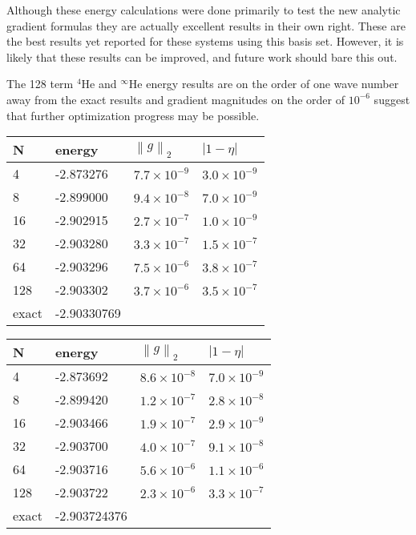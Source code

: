 \documentclass[12pt,thmsa,suthesis,verbatim]{report}
\begin{document}
Although these energy calculations were done primarily to test the new
analytic gradient formulas they are actually excellent results in their own
right. These are the best results yet reported for these systems using this
basis set. However, it is likely that these results can be improved, and
future work should bare this out.

The 128 term $^4$He and $^\infty $He energy results are on the order of one
wave number away from the exact results and gradient magnitudes on the order
of $10^{-6}$ suggest that further optimization progress may be possible.

\begin{tabular}{llll}
\hline\hline
N & energy & $\left\| g\right\| _2$ & $\left| 1-\eta \right| $ \\ \hline
4 & -2.873276 & $7.7\times 10^{-9}$ & $3.0\times 10^{-9}$ \\ 
8 & -2.899000 & $9.4\times 10^{-8}$ & $7.0\times 10^{-9}$ \\ 
16 & -2.902915 & $2.7\times 10^{-7}$ & $1.0\times 10^{-9}$ \\ 
32 & -2.903280 & $3.3\times 10^{-7}$ & $1.5\times 10^{-7}$ \\ 
64 & -2.903296 & $7.5\times 10^{-6}$ & $3.8\times 10^{-7}$ \\ 
128 & -2.903302 & $3.7\times 10^{-6}$ & $3.5\times 10^{-7}$ \\ 
exact\cite{Kleidienst81} & -2.90330769 &  &  \\ \hline\hline
\end{tabular}
\caption{$ ^{4}$He energy calculations using from 4 to 128 basis functions
 Optimization using TN\label{He4eng}}

\begin{tabular}{llll}
\hline\hline
N & energy & $\left\| g\right\| _2$ & $\left| 1-\eta \right| $ \\ \hline
4 & -2.873692 & $8.6\times 10^{-8}$ & $7.0\times 10^{-9}$ \\ 
8 & -2.899420 & $1.2\times 10^{-7}$ & $2.8\times 10^{-8}$ \\ 
16 & -2.903466 & $1.9\times 10^{-7}$ & $2.9\times 10^{-9}$ \\ 
32 & -2.903700 & $4.0\times 10^{-7}$ & $9.1\times 10^{-8}$ \\ 
64 & -2.903716 & $5.6\times 10^{-6}$ & $1.1\times 10^{-6}$ \\ 
128 & -2.903722 & $2.3\times 10^{-6}$ & $3.3\times 10^{-7}$ \\ 
exact\cite{Pekeris60} & -2.903724376 &  &  \\ \hline\hline
\end{tabular}
\caption{$ ^{\infty}$He energy calculations using from 4 to 128 basis functions
 Optimization using TN\label{Heeng}}
\end{document}
